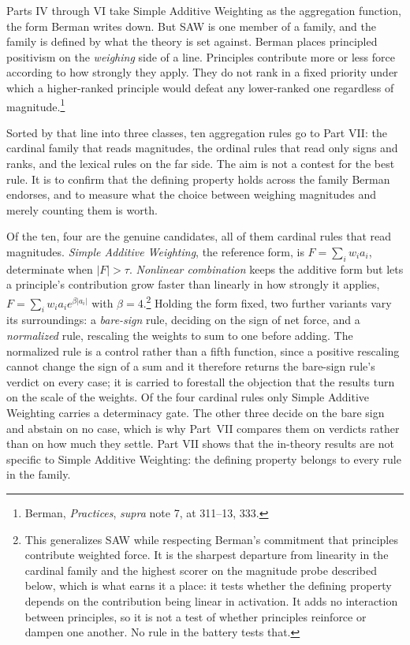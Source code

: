 Parts IV through VI take Simple Additive Weighting as the aggregation
function, the form Berman writes down. But SAW is one member of a family,
and the family is defined by what the theory is set against. Berman places principled positivism on the \textit{weighing} side of a
line. Principles contribute more or less force according to how strongly
they apply. They do not rank in a fixed priority under which a higher-ranked principle would defeat any lower-ranked one regardless of magnitude.\footnote{Berman,
\textit{Practices}, \textit{supra} note 7, at 311--13, 333.}

Sorted by that line into three classes, ten aggregation rules go to Part
VII: the cardinal family that reads magnitudes, the ordinal rules that read
only signs and ranks, and the lexical rules on the far side. The aim is not a
contest for the best rule. It is to confirm that the defining property holds
across the family Berman endorses, and to measure what the choice between
weighing magnitudes and merely counting them is worth.

Of the ten, four are the genuine candidates, all of them cardinal rules that
read magnitudes. \textit{Simple Additive Weighting}, the reference form,
is $F = \sum_i w_i a_i$, determinate when $|F| > \tau$. \textit{Nonlinear combination} keeps the additive form but lets a
principle's contribution grow faster than linearly in how strongly it
applies, $F = \sum_i w_i a_i e^{\beta |a_i|}$ with $\beta =
4$.\footnote{This generalizes SAW while respecting Berman's commitment that
principles contribute weighted force. It is the sharpest departure from linearity in the cardinal family and the
highest scorer on the magnitude probe described below, which is what earns it
a place: it tests whether the defining
property depends on the contribution being linear in activation. It adds no
interaction between principles, so it is not a test of whether principles
reinforce or dampen one another. No rule in the battery tests that.} Holding the form fixed, two further variants vary its surroundings: a
\textit{bare-sign} rule, deciding on the sign of net force, and a
\textit{normalized} rule, rescaling the weights to sum to one before
adding. The normalized rule is a control rather than a fifth function, since a
positive rescaling cannot change the sign of a sum and it therefore returns
the bare-sign rule's verdict on every case; it is carried to forestall the
objection that the results turn on the scale of the weights. Of the four
cardinal rules only Simple Additive Weighting carries a determinacy gate. The
other three decide on the bare sign and abstain on no case, which is why
Part~VII compares them on verdicts rather than on how much they settle. Part VII shows that the in-theory results are not specific to
Simple Additive Weighting: the defining property belongs to every rule in the
family.

